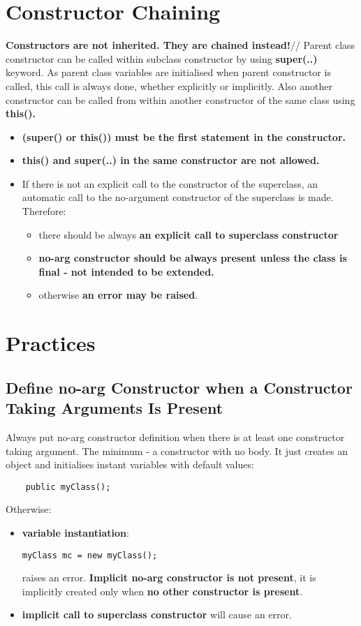 \documentclass{report}
\begin{document}
\section{Constructor Chaining}
\textbf{Constructors are not inherited. They are chained instead!}//
Parent class constructor can be called within subclass constructor by using \textbf{super(..)} keyword. As parent class variables are initialised when parent constructor is called,
this call is always done, whether explicitly or implicitly. Also another constructor can be called from within another constructor of the same class using \textbf{this().}
\begin{itemize}
	\item \textbf{(super() or this()) must be the first statement in the constructor.}
	\item \textbf{this() and super(..) in the same constructor are not allowed.}
	\item If there is not an explicit call to the constructor of the superclass, an automatic call to the no-argument constructor of the superclass is made.
	Therefore:
	\begin{itemize}
		\item there should be always \textbf{an explicit call to superclass constructor}
		\item \textbf{no-arg constructor should be always present unless the class is final - not intended to be extended.}
		\item otherwise \textbf{an error may be raised}.
	\end{itemize}
\end{itemize}


\section{Practices}

\subsection{Define no-arg Constructor when a Constructor Taking Arguments Is Present }
	Always put no-arg constructor definition when there is at least one constructor taking argument.
	The minimum - a constructor with no body. It just creates an object and initialises instant variables with default values:
	\begin{verbatim}
	public myClass();
	\end{verbatim}
    
	Otherwise:
	\begin{itemize}
		\item \textbf{variable instantiation}:
			\begin{verbatim}
myClass mc = new myClass();
		      \end{verbatim}
              
		raises an error. \textbf{Implicit no-arg constructor is not present}, it is implicitly created only when \textbf{no other constructor is present}.
		
		\item \textbf{implicit call to superclass constructor} will cause an error.
	\end{itemize}
	
\end{document}
